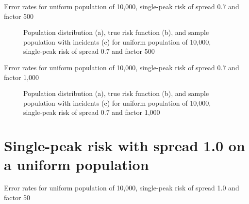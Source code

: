
\begin{table}[H]

\caption[]{Error rates for uniform population of 10,000, single-peak risk of \gls{spread} 0.7 and \gls{factor} 500}
\label{tab:mean_error_rates:unif_500_0.7_1h}
\end{table}

\begin{figure}[H]
    
    \caption[]{Population distribution (a), true risk function (b), and sample population with incidents (c) for uniform population of 10,000, single-peak risk of \gls{spread} 0.7 and \gls{factor} 500}
    \label{fig:distributions:unif_500_0.7_1h}    
\end{figure}



\begin{table}[H]

\caption[]{Error rates for uniform population of 10,000, single-peak risk of \gls{spread} 0.7 and \gls{factor} 1,000}
\label{tab:mean_error_rates:unif_1000_0.7_1h}
\end{table}

\begin{figure}[H]
    
    \caption[]{Population distribution (a), true risk function (b), and sample population with incidents (c) for uniform population of 10,000, single-peak risk of \gls{spread} 0.7 and \gls{factor} 1,000}
    \label{fig:distributions:unif_1000_0.7_1h}    
\end{figure}

\section{Single-peak risk with spread 1.0 on a uniform population}
\label{sec:app:results_unif_1.0_1h}


\begin{table}[H]
    
    \caption[]{Error rates for uniform population of 10,000, single-peak risk of \gls{spread} 1.0 and \gls{factor} 50}
    \label{tab:mean_error_rates:unif_50_1.0_1h}
\end{table}

